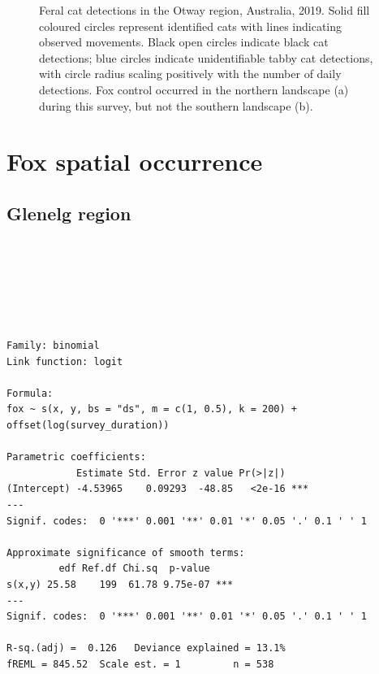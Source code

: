 \documentclass[11pt,a4paper,titlepage,twoside,openright]{style/unimelbthesis}
\begin{document}
\begin{mainmatter}
\begin{figure}
{}

\caption{Feral cat detections in the Otway region, Australia, 2019. Solid fill coloured circles represent identified cats with lines indicating observed movements. Black open circles indicate black cat detections; blue circles indicate unidentifiable tabby cat detections, with circle radius scaling positively with the number of daily detections. Fox control occurred in the northern landscape (a) during this survey, but not the southern landscape (b).}\label{fig:density-plot-ch-6}
\end{figure}
\newpage

\hypertarget{density-app-fox}{%
\section{Fox spatial occurrence}\label{density-app-fox}}

\hypertarget{glenelg-region-3}{%
\subsection{Glenelg region}\label{glenelg-region-3}}

\(~\)

\(~\)

\(~\)
\begin{verbatim}

Family: binomial 
Link function: logit 

Formula:
fox ~ s(x, y, bs = "ds", m = c(1, 0.5), k = 200) + offset(log(survey_duration))

Parametric coefficients:
            Estimate Std. Error z value Pr(>|z|)    
(Intercept) -4.53965    0.09293  -48.85   <2e-16 ***
---
Signif. codes:  0 '***' 0.001 '**' 0.01 '*' 0.05 '.' 0.1 ' ' 1

Approximate significance of smooth terms:
         edf Ref.df Chi.sq  p-value    
s(x,y) 25.58    199  61.78 9.75e-07 ***
---
Signif. codes:  0 '***' 0.001 '**' 0.01 '*' 0.05 '.' 0.1 ' ' 1

R-sq.(adj) =  0.126   Deviance explained = 13.1%
fREML = 845.52  Scale est. = 1         n = 538
\end{verbatim}
\newpage

\(~\)

\(~\)

\(~\)
\begin{figure}


\end{figure}
\end{mainmatter}
\end{document}
